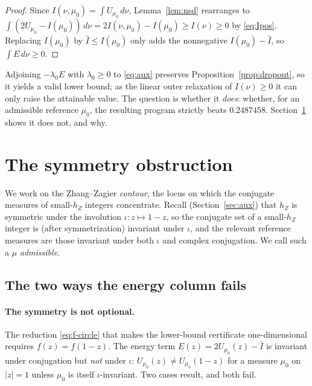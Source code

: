 \documentclass[11pt,reqno]{amsart}
\theoremstyle{plain}
\theoremstyle{definition}
\newcommand{\hZ}{h_Z}
\newcommand{\Ihat}{\widehat{I}}
\begin{document}
\begin{proof}
Since $I(\nu,\mu_0)=\int U_{\mu_0}\,d\nu$, Lemma~\ref{lem:nsd} rearranges to
$\int(2U_{\mu_0}-I(\mu_0))\,d\nu=2I(\nu,\mu_0)-I(\mu_0)\ge I(\nu)\ge0$ by
\eqref{eq:Ipos}. Replacing $I(\mu_0)$ by $\Ihat\le I(\mu_0)$ only adds the nonnegative
$I(\mu_0)-\Ihat$, so $\int E\,d\nu\ge0$.
\end{proof}

Adjoining $-\lambda_0E$ with $\lambda_0\ge0$ to \eqref{eq:aux} preserves
Proposition~\ref{prop:dropout}, so it yields a valid lower bound; as the linear outer
relaxation of $I(\nu)\ge0$ it can only raise the attainable value. The question is
whether it \emph{does}: whether, for an admissible reference $\mu_0$, the resulting
program strictly beats $0.2487458$. Section~\ref{sec:nogo} shows it does not, and why.

\section{The symmetry obstruction}\label{sec:nogo}

We work on the Zhang--Zagier \emph{contour}, the locus on which the conjugate measures
of small-$\hZ$ integers concentrate. Recall (Section~\ref{sec:aux}) that $\hZ$ is
symmetric under the involution $\iota:z\mapsto1-z$, so the conjugate set of a
small-$\hZ$ integer is (after symmetrization) invariant under $\iota$, and the
relevant reference measures are those invariant under both $\iota$ and complex
conjugation. We call such a $\mu$ \emph{admissible}.

\subsection{The two ways the energy column fails}\label{subsec:twoways}

\paragraph{The symmetry is not optional.} The reduction \eqref{eq:f-circle} that makes
the lower-bound certificate one-dimensional requires $f(z)=f(1-z)$. The energy term
$E(z)=2U_{\mu_0}(z)-\Ihat$ is invariant under conjugation but \emph{not} under
$\iota$: $U_{\mu_0}(z)\ne U_{\mu_0}(1-z)$ for a measure $\mu_0$ on $|z|=1$ unless
$\mu_0$ is itself $\iota$-invariant. Two cases result, and both fail.
\end{document}
